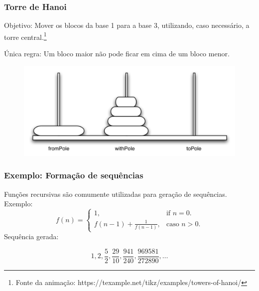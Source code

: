 \documentclass[10pt, handout]{beamer}
\begin{document}
\begin{frame}[t]
  \frametitle{Torre de Hanoi}
  Objetivo: Mover os blocos da base 1 para a base 3, utilizando, caso necessário, a torre central.\footnote{Fonte da animação: https://texample.net/tikz/examples/towers-of-hanoi/}

  Única regra: Um bloco maior não pode ficar em cima de um bloco menor.
  \begin{figure}[h]
    \begin{center}
      \includegraphics[width=12cm]{./fig/hanoi.png}
    \end{center}
  \end{figure}
\end{frame}


\begin{frame}
  \frametitle{Exemplo: Formação de sequências}
  Funções recursivas são comumente utilizadas para geração de sequências. Exemplo:
  \begin{equation}
    f(n)=\begin{cases}
      1,                         & \text{if $n=0$}.     \\
      f(n-1) + \frac{1}{f(n-1)}, & \text{caso $n > 0$}.
    \end{cases}
  \end{equation}
  \pause
  Sequência gerada:

  $$1, 2, \frac{5}{2}, \frac{29}{10}, \frac{941}{240}, \frac{969581}{272890}, \ldots$$
\end{frame}
\end{document}
